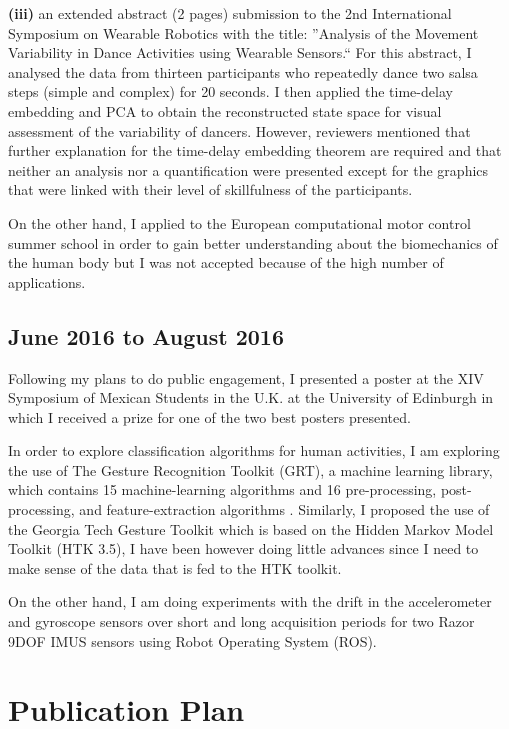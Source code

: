 \documentclass[9pt,journal,onecolumn,compsoc]{IEEEtran}
\begin{document}
\textbf{(iii)} an extended abstract (2 pages) submission to the 2nd International Symposium on Wearable Robotics
with the title: ''Analysis of the Movement Variability in Dance Activities using Wearable Sensors.`` 
For this abstract,
I analysed the data from thirteen participants who repeatedly dance two salsa steps (simple and complex) for 20 seconds. 
I then applied the time-delay embedding and PCA to obtain the reconstructed state space
for visual assessment of the variability of dancers. 
However, reviewers mentioned that further explanation for the time-delay embedding theorem are required
and that neither an analysis nor a quantification were presented except for the
graphics that were linked with their level of skillfulness of the participants. 






On the other hand,
I applied to the European computational motor control summer school
in order to gain better understanding about the biomechanics of the human body 
but I was not accepted because of the high number of applications.

\subsection{June 2016 to August 2016}

Following my plans to do public engagement, I presented a poster at the XIV Symposium of Mexican Students in the U.K. 
at the University of Edinburgh in which I received a prize for one of the two best posters presented.

In order to explore classification algorithms for human activities,
I am exploring the use of The Gesture Recognition Toolkit (GRT), a machine learning library,
which contains 15 machine-learning algorithms and 16 pre-processing, post-processing, and feature-extraction algorithms 
\cite{Gillian2014}. Similarly, I proposed the use of the Georgia Tech Gesture Toolkit \cite{Westeyn2003}
which is based on the Hidden Markov Model Toolkit (HTK 3.5), I have been however 
doing little advances since I need to make sense of the data that is fed to the HTK toolkit.

On the other hand, I am doing experiments with the drift in the accelerometer and gyroscope sensors 
over short and long acquisition periods for two Razor 9DOF IMUS sensors using Robot Operating System (ROS).

\section{Publication Plan}
\end{document}
